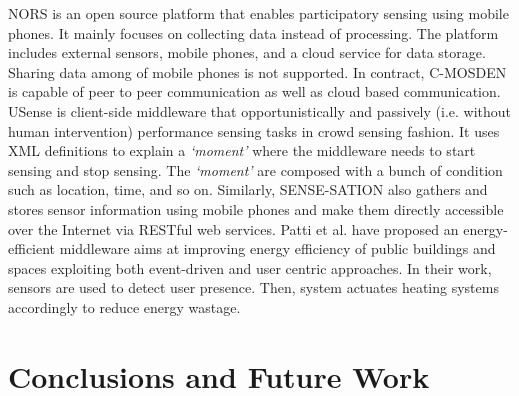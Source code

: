 \documentclass[journal]{IEEEtran}
\begin{document}
NORS \cite{Z1023} is an open source platform that enables participatory sensing using mobile phones. It mainly focuses on collecting data instead of processing. The platform includes external sensors, mobile phones, and a cloud service for data storage. Sharing data among of mobile phones is not supported. In contract, C-MOSDEN is capable of peer to peer communication as well as cloud based communication. USense \cite{Z1024} is client-side middleware that opportunistically and passively (i.e. without human intervention) performance sensing tasks in crowd sensing fashion. It uses XML definitions to explain a \textit{`moment'} where the middleware needs to start sensing and stop sensing. The \textit{`moment'} are composed with a bunch of condition such as location, time, and so on. Similarly, SENSE-SATION \cite{Z1025} also gathers and stores sensor information using mobile phones and make them directly accessible over the Internet via RESTful web services. Patti et al. \cite{Patti} have proposed an energy-efficient middleware aims at improving energy efficiency of public buildings and spaces exploiting both event-driven and user centric approaches. In their work, sensors are used to detect user presence. Then, system actuates heating systems accordingly to reduce energy wastage.






\section{Conclusions and Future Work}
\label{sec:Conclusions and Future Work}
\end{document}
